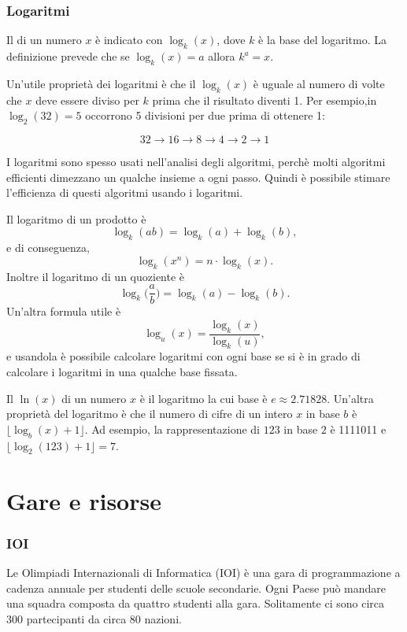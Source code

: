 \subsubsection{Logaritmi}


Il  di un numero $x$
è indicato con $\log_k(x)$, dove $k$ è la base
del logaritmo.
La definizione prevede che se
$\log_k(x)=a$ allora $k^a=x$.

Un'utile proprietà dei logaritmi
è che il $\log_k(x)$ è uguale al numero di volte
che $x$ deve essere diviso per $k$ prima che il risultato 
diventi 1.
Per esempio,in $\log_2(32)=5$
occorrono 5 divisioni per due prima di ottenere 1:

\[32 \rightarrow 16 \rightarrow 8 \rightarrow 4 \rightarrow 2 \rightarrow 1 \]

I logaritmi sono spesso usati nell'analisi
degli algoritmi, perchè molti algoritmi efficienti
dimezzano un qualche insieme a ogni passo.
Quindi è possibile stimare l'efficienza di questi algoritmi
usando i logaritmi.

Il logaritmo di un prodotto è
\[\log_k(ab) = \log_k(a)+\log_k(b),\]
e di conseguenza,
\[\log_k(x^n) = n \cdot \log_k(x).\]
Inoltre il logaritmo di un quoziente è
\[\log_k\Big(\frac{a}{b}\Big) = \log_k(a)-\log_k(b).\]
Un'altra formula utile è
\[\log_u(x) = \frac{\log_k(x)}{\log_k(u)},\]
e usandola è possibile calcolare
logaritmi con ogni base se si è in grado
di calcolare i logaritmi in una qualche base fissata.


Il  $\ln(x)$ di un numero $x$
è il logaritmo la cui base è $e \approx 2.71828$.
Un'altra proprietà del logaritmo è che il numero di cifre
di un intero $x$ in base $b$ è
$\lfloor \log_b(x)+1 \rfloor$.
Ad esempio, la rappresentazione di
$123$ in base $2$ è 1111011 e
$\lfloor \log_2(123)+1 \rfloor = 7$.

\section{Gare e risorse}

\subsubsection{IOI}

Le Olimpiadi Internazionali di Informatica (IOI)
è una gara di programmazione a cadenza annuale per studenti delle scuole secondarie.
Ogni Paese può mandare una squadra composta da quattro studenti alla gara.
Solitamente ci sono circa 300 partecipanti da circa 80 nazioni.

